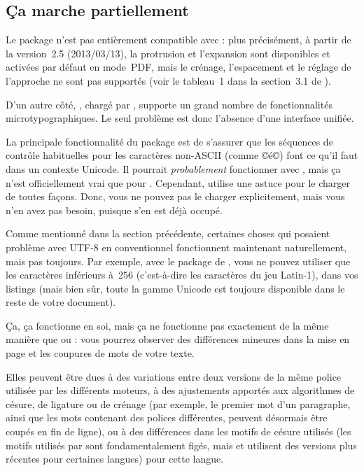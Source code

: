 \documentclass{lltxdoc}
\begin{document}
\subsection{Ça marche partiellement}\label{partial}

Le package  n'est pas entièrement compatible avec \luatex:
plus précisément, à partir de la version~2.5 (2013/03/13), la protrusion
et l'expansion sont disponibles et activées par défaut en mode~PDF, mais
le crénage, l'espacement et le réglage de l'approche ne sont pas supportés
(voir le tableau~1 dans la section~3.1 de ).

D'un autre côté, , chargé par , supporte un grand
nombre de fonctionnalités microtypographiques. Le seul problème est donc
l'absence d'une interface unifiée.

La principale fonctionnalité du package  est de s'assurer que les
séquences de contrôle habituelles pour les caractères non-ASCII (comme ©\'e©)
font ce qu'il faut dans un contexte Unicode. Il pourrait \emph{probablement}
fonctionner avec \luatex, mais ça n'est officiellement vrai que pour \xetex.
Cependant,  utilise une astuce pour le charger de toutes façons.
Donc, vous ne pouvez pas le charger explicitement, mais vous n'en avez pas besoin,
puisque  s'en est déjà occupé.

Comme mentionné dans la section précédente, certaines choses qui posaient problème
avec UTF-8 en \latex conventionnel fonctionnent maintenant naturellement, mais pas
toujours. Par exemple, avec le package  de \lualatex, vous ne pouvez
utiliser que les caractères inférieurs à~256 (c'est-à-dire les caractères du jeu
Latin-1), dans vos listings (mais bien sûr, toute la gamme Unicode est toujours
disponible dans le reste de votre document).

Ça, ça fonctionne en soi, mais ça ne fonctionne pas exactement de la même manière
que \pdftex ou \xetex: vous pourrez observer des différences mineures dans
la mise en page et les coupures de mots de votre texte.

Elles peuvent être dues à des variations entre deux versions de la même police
utilisée par les différents moteurs, à des ajustements apportés aux algorithmes
de césure, de ligature ou de crénage (par exemple, le premier mot d'un paragraphe,
ainsi que les mots contenant des polices différentes, peuvent désormais être coupés
en fin de ligne), ou à des différences dans les motifs de césure utilisés (les motifs
utilisés par \pdftex sont fondamentalement figés, mais \luatex et \xetex utilisent
des versions plus récentes pour certaines langues) pour cette langue.
\end{document}
